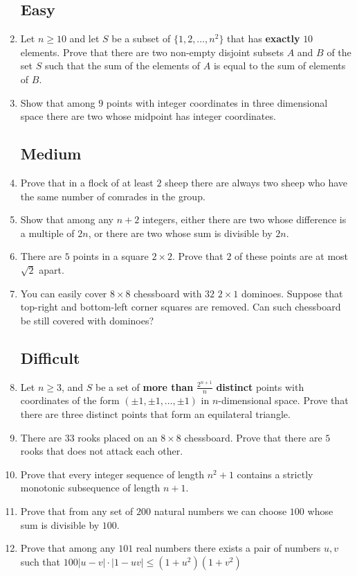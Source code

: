 \documentclass[12pt,a4paper]{article}
\begin{document}
\begin{enumerate}
	\subsection*{Easy}	
	\item{Let $n\geq10$ and let $S$ be a subset of $\{1,2,\dots,n^{2}\}$} that has \textbf{exactly} $10$ elements. Prove that there are two non-empty disjoint subsets $A$ and $B$ of the set $S$ such that the sum of the elements of $A$ is equal to the sum of elements of $B$.
	
	\item{Show that among $9$ points with integer coordinates in three dimensional space there are two whose midpoint has integer coordinates.}
	
	\subsection*{Medium}
	\item{Prove that in a flock of at least $2$ sheep there are always two sheep who have the same number of comrades in the group.}
	
	\item{Show that among any $n+2$ integers, either there are two whose difference is a multiple of $2n$, or there are two whose sum is divisible by $2n$.}
	
	\item{There are $5$ points in a square $2\times 2$. Prove that $2$ of these points are at most $\sqrt2$ apart.}
	
	\item{You can easily cover $8\times 8$ chessboard with $32$ $2\times 1$ dominoes. Suppose that top-right and bottom-left corner squares are removed. Can such chessboard be still covered with dominoes?}

	\subsection*{Difficult}
	\item{Let $n\geq3$, and $S$ be a set of \textbf{more than} $\frac{2^{n+1}}{n}$ \textbf{distinct} points with coordinates of the form $(\pm1,\pm1,\dots,\pm1)$ in $n$-dimensional space. Prove that there are three distinct points that form an equilateral triangle.}
	
	\item{There are $33$ rooks placed on an $8\times 8$ chessboard. Prove that there are $5$ rooks that does not attack each other.}
	
	\item{Prove that every integer sequence of length $n^2+1$ contains a strictly monotonic subsequence of length $n+1$.}
	
	\item{Prove that from any set of $200$ natural numbers we can choose $100$ whose sum is divisible by $100$.}
	
	\item{Prove that among any $101$ real numbers there exists a pair of numbers $u, v$ such that $100|u - v|\cdot|1-uv| \leq (1 + u^{2})(1 + v^{2})$}
	
\end{enumerate}
\end{document}
